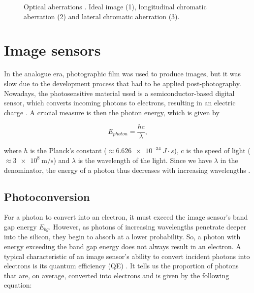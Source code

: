 \begin{figure}
    \centering
    \caption{Optical aberrations \cite{aberration}. Ideal image (1), longitudinal chromatic aberration (2) and lateral chromatic aberration (3).}
    \label{fig:aberration}
\end{figure}

 
\section{Image sensors}

In the analogue era, photographic film was used to produce images, but it was slow due to the development process that had to be applied post-photography. Nowadays, the photosensitive material used is a semiconductor-based digital sensor, which converts incoming photons to electrons, resulting in an electric charge  \cite[272-274]{nakamura}. A crucial measure is then the photon energy, which is given by

\begin{equation}
\label{eq:photon}
{E_{photon}} = \frac{hc}{\lambda},
\end{equation}

where $h$ is the Planck's constant ($\approx \SI{6.626e-34}{J\cdot s}$), c is the speed of light
($\approx \SI{3e+8}{\meter\per\second}$) and $\lambda$ is the wavelength of the light. Since we have $\lambda$ in the denominator, the energy of a photon thus decreases with increasing wavelengths \cite[61-62]{Hecht} \cite[55-56]{nakamura}.

\subsection{Photoconversion}
\label{ss:photoconversion}
For a photon to convert into an electron, it must exceed the image sensor's band gap energy $E_{bg}$. However, as photons of increasing wavelengths penetrate deeper into the silicon, they begin to absorb at a lower probability. So, a photon with energy exceeding the band gap energy does not always result in an electron. A typical characteristic of an image sensor's ability to convert incident photons into electrons is its quantum efficiency (QE) \cite[77]{nakamura}. It tells us the proportion of photons that are, on average, converted into electrons and is given by the following equation: 


